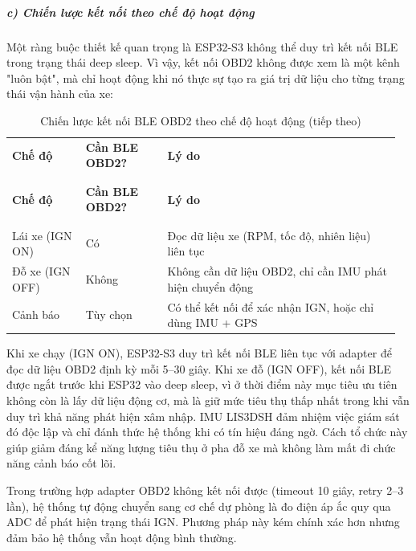 \documentclass[a4paper]{extarticle}
\newcommand{\thesissettableid}[2]{%
  \renewcommand{\thetable}{#1}%
  \renewcommand{\theHtable}{#2}%
}
\begin{document}
\subparagraph{c) Chiến lược kết nối theo chế độ hoạt
động}\label{c-chiux1ebfn-lux1b0ux1ee3c-kux1ebft-nux1ed1i-theo-chux1ebf-ux111ux1ed9-houx1ea1t-ux111ux1ed9ng}

Một ràng buộc thiết kế quan trọng là ESP32-S3 không thể duy trì kết nối
BLE trong trạng thái deep sleep. Vì vậy, kết nối OBD2 không được xem là
một kênh "luôn bật", mà chỉ hoạt động khi nó thực sự tạo ra giá trị dữ liệu
cho từng trạng thái vận hành của xe:


{\thesissettableid{3.6}{tab-ch3-chien-luoc-ket-noi-ble-obd2-theo-che-o-hoat-ong}
\def\LTcaptype{table}
\begin{longtable}{|L{0.182\linewidth}|L{0.203\linewidth}|L{0.580\linewidth}|}
\caption{Chiến lược kết nối BLE OBD2 theo chế độ hoạt động}\label{tab:ch3-chien-luoc-ket-noi-ble-obd2-theo-che-o-hoat-ong}\\
\hline \textbf{Chế độ} & \textbf{Cần BLE OBD2?} & \textbf{Lý do} \\
\\\hline
\endfirsthead
\caption[]{Chiến lược kết nối BLE OBD2 theo chế độ hoạt động (tiếp theo)}\\
\hline \textbf{Chế độ} & \textbf{Cần BLE OBD2?} & \textbf{Lý do} \\
\\\hline
\endhead
\\\hline
\endfoot
\endlastfoot
Lái xe (IGN ON) & Có & Đọc dữ liệu xe (RPM, tốc độ, nhiên liệu) liên
tục \\\hline
Đỗ xe (IGN OFF) & Không & Không cần dữ liệu OBD2, chỉ cần IMU phát hiện
chuyển động \\\hline
Cảnh báo & Tùy chọn & Có thể kết nối để xác nhận IGN, hoặc chỉ dùng IMU
+ GPS \\\hline
\end{longtable}
}


Khi xe chạy (IGN ON), ESP32-S3 duy trì kết nối BLE liên tục với adapter để
đọc dữ liệu OBD2 định kỳ mỗi 5--30 giây. Khi xe đỗ (IGN OFF), kết nối BLE
được ngắt trước khi ESP32 vào deep sleep, vì ở thời điểm này mục tiêu ưu
tiên không còn là lấy dữ liệu động cơ, mà là giữ mức tiêu thụ thấp nhất
trong khi vẫn duy trì khả năng phát hiện xâm nhập. IMU LIS3DSH đảm nhiệm
việc giám sát đó độc lập và chỉ đánh thức hệ thống khi có tín hiệu đáng
ngờ. Cách tổ chức này giúp giảm đáng kể năng lượng tiêu thụ ở pha đỗ xe mà
không làm mất đi chức năng cảnh báo cốt lõi.

Trong trường hợp adapter OBD2 không kết nối được (timeout 10 giây, retry
2--3 lần), hệ thống tự động chuyển sang cơ chế dự phòng là đo điện áp
ắc quy qua ADC để phát hiện trạng thái IGN. Phương pháp
này kém chính xác hơn nhưng đảm bảo hệ thống vẫn hoạt động bình thường.
\end{document}
